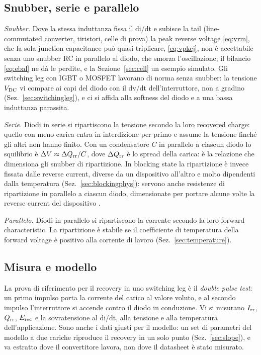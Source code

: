 \documentclass[10pt,a4paper]{scrartcl}
\let\newcommand\pdvaluedefine
\newcommand{\Irr}{I_\mathrm{rr}}
\newcommand{\Qrr}{Q_\mathrm{rr}}
\newcommand{\Vdc}{V_\mathrm{DC}}
\newcommand{\Erec}{E_\mathrm{rec}}
\begin{document}
\subsection{Snubber, serie e parallelo}
\emph{Snubber.} Dove la stessa induttanza fissa il di/dt e subisce la tail (line-commutated converter, tiristori, celle di prova) la peak reverse voltage \eqref{eq:vrm}, che la sola junction capacitance può quasi triplicare, \eqref{eq:vpkcj}, non è accettabile senza uno snubber RC in parallelo al diodo, che smorza l'oscillazione; il bilancio \eqref{eq:ebal} ne dà le perdite, e la Sezione~\ref{sec:cell} un esempio simulato. Gli switching leg con IGBT o MOSFET lavorano di norma senza snubber: la tensione $\Vdc$ vi compare ai capi del diodo con il dv/dt dell'interruttore, non a gradino (Sez.~\ref{sec:switchingleg}), e ci si affida alla softness del diodo e a una bassa induttanza parassita.

\emph{Serie.} Diodi in serie si ripartiscono la tensione secondo la loro recovered charge: quello con meno carica entra in interdizione per primo e assume la tensione finché gli altri non hanno finito. Con un condensatore $C$ in parallelo a ciascun diodo lo squilibrio è $\Delta V \approx \Delta\Qrr/C$, dove $\Delta\Qrr$ è lo spread della carica: è la relazione che dimensiona gli snubber di ripartizione. In blocking state la ripartizione è invece fissata dalle reverse current, diverse da un dispositivo all'altro e molto dipendenti dalla temperatura (Sez.~\ref{sec:blockingphys}): servono anche resistenze di ripartizione in parallelo a ciascun diodo, dimensionate per portare alcune volte la reverse current del dispositivo \cite{dynexan6531,stan443}.

\emph{Parallelo.} Diodi in parallelo si ripartiscono la corrente secondo la loro forward characteristic. La ripartizione è stabile se il coefficiente di temperatura della forward voltage è positivo alla corrente di lavoro (Sez.~\ref{sec:temperature}).

\subsection{Misura e modello}
La prova di riferimento per il recovery in uno switching leg è il \emph{double pulse test}: un primo impulso porta la corrente del carico al valore voluto, e al secondo impulso l'interruttore si accende contro il diodo in conduzione. Vi si misurano $\Irr$, $\Qrr$, $\Erec$ e la sovratensione al di/dt, alla tensione e alla temperatura dell'applicazione. Sono anche i dati giusti per il modello: un set di parametri del modello a due cariche riproduce il recovery in un solo punto (Sez.~\ref{sec:slope}), e va estratto dove il convertitore lavora, non dove il datasheet è stato misurato.
\end{document}
